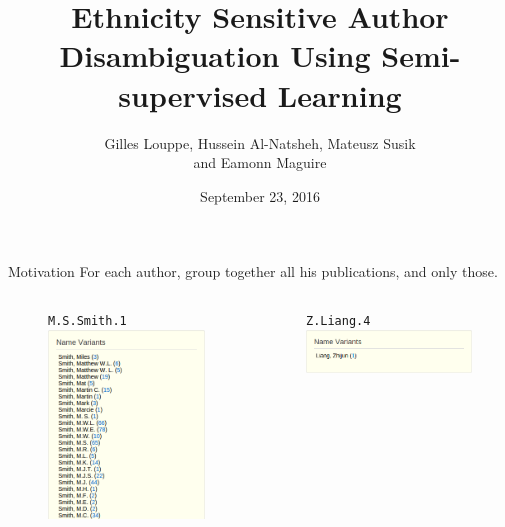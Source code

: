\documentclass{beamer}
\title{\bf Ethnicity Sensitive Author Disambiguation Using Semi-supervised Learning}
\author{Gilles Louppe, Hussein Al-Natsheh, Mateusz Susik \\and 
Eamonn Maguire}
\institute{KESW 2016, Prague}
\date{September 23, 2016}
\begin{document}
\begin{frame}
\titlepage
\end{frame}



\begin{frame}{Motivation}
For each author, group together all his publications, and only those.

\footnotesize{
\begin{columns}[T]

\begin{column}{0.33\textwidth}
\begin{figure}
\texttt{M.S.Smith.1}
\includegraphics[width=\textwidth]{figures/no-more.png}
\end{figure}
\end{column}
\begin{column}{0.33\textwidth}
\begin{figure}
\texttt{Z.Liang.4}
\includegraphics[width=\textwidth]{figures/no-less.png}


\end{figure}
\end{column}
\end{columns}}
\end{frame}
\end{document}
